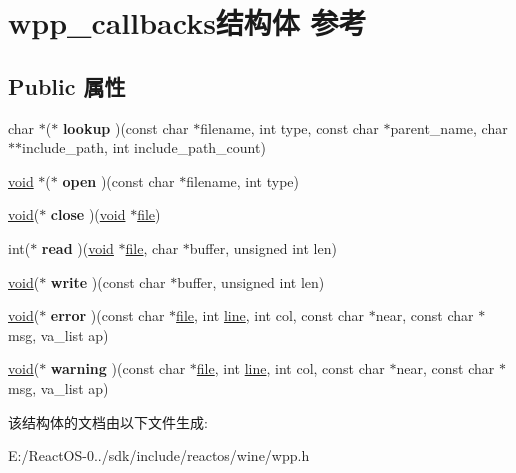 \hypertarget{structwpp__callbacks}{}\section{wpp\+\_\+callbacks结构体 参考}
\label{structwpp__callbacks}
\subsection*{Public 属性}
\begin{DoxyCompactItemize}
\item 
\mbox{\label{structwpp__callbacks_a3fcd394927c99a1584cbe818a4253904}} 
char $\ast$($\ast$ {\bfseries lookup} )(const char $\ast$filename, int type, const char $\ast$parent\+\_\+name, char $\ast$$\ast$include\+\_\+path, int include\+\_\+path\+\_\+count)
\item 
\mbox{\label{structwpp__callbacks_a1d70669ca6f6a886debbf649d5bf0b99}} 
\hyperlink{interfacevoid}{void} $\ast$($\ast$ {\bfseries open} )(const char $\ast$filename, int type)
\item 
\mbox{\label{structwpp__callbacks_a75a70f67698fc0484f589104feb495c3}} 
\hyperlink{interfacevoid}{void}($\ast$ {\bfseries close} )(\hyperlink{interfacevoid}{void} $\ast$\hyperlink{structfile}{file})
\item 
\mbox{\label{structwpp__callbacks_a807d19acfb6c10afdfa4ecf5788b561c}} 
int($\ast$ {\bfseries read} )(\hyperlink{interfacevoid}{void} $\ast$\hyperlink{structfile}{file}, char $\ast$buffer, unsigned int len)
\item 
\mbox{\label{structwpp__callbacks_a5b67b62694fd1f126a4af64549087d02}} 
\hyperlink{interfacevoid}{void}($\ast$ {\bfseries write} )(const char $\ast$buffer, unsigned int len)
\item 
\mbox{\label{structwpp__callbacks_a9c50682b88bac5ca916b859f031b10e7}} 
\hyperlink{interfacevoid}{void}($\ast$ {\bfseries error} )(const char $\ast$\hyperlink{structfile}{file}, int \hyperlink{structline}{line}, int col, const char $\ast$near, const char $\ast$msg, va\+\_\+list ap)
\item 
\mbox{\label{structwpp__callbacks_a0b9ad5ac4f4ee796817dbc1a976f5b8b}} 
\hyperlink{interfacevoid}{void}($\ast$ {\bfseries warning} )(const char $\ast$\hyperlink{structfile}{file}, int \hyperlink{structline}{line}, int col, const char $\ast$near, const char $\ast$msg, va\+\_\+list ap)
\end{DoxyCompactItemize}


该结构体的文档由以下文件生成\+:\begin{DoxyCompactItemize}
\item 
E\+:/\+React\+O\+S-\/0../sdk/include/reactos/wine/wpp.\+h\end{DoxyCompactItemize}
